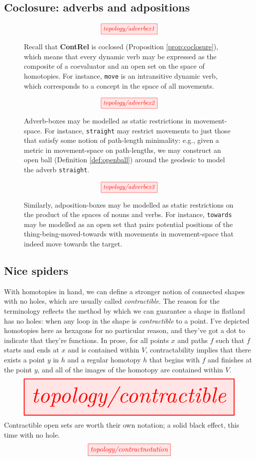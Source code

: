\clearpage

\subsection{Coclosure: adverbs and adpositions}

\begin{figure}[h!]
\[\scalebox{0.9}{\tikzfig{topology/adverbex1}}\]
\caption{
Recall that \textbf{ContRel} is coclosed (Proposition \ref{prop:coclosure}), which means that every dynamic verb may be expressed as the composite of a coevaluator and an open set on the space of homotopies. For instance, \texttt{move} is an intransitive dynamic verb, which corresponds to a concept in the space of all movements.
}
\end{figure}

\begin{figure}[h!]
\[\scalebox{0.9}{\tikzfig{topology/adverbex2}}\]
\caption{
Adverb-boxes may be modelled as static restrictions in movement-space. For instance, \texttt{straight} may restrict movements to just those that satisfy some notion of path-length minimality: e.g., given a metric in movement-space on path-lengths, we may construct an open ball (Definition \ref{def:openball}) around the geodesic to model the adverb \texttt{straight}.
}
\end{figure}

\begin{figure}[h!]
\[\scalebox{0.9}{\tikzfig{topology/adverbex3}}\]
\caption{
Similarly, adposition-boxes may be modelled as static restrictions on the product of the spaces of nouns and verbs. For instance, \texttt{towards} may be modelled as an open set that pairs potential positions of the thing-being-moved-towards with movements in movement-space that indeed move towards the target.
}
\end{figure}

\clearpage

\subsection{Nice spiders}

\begin{example}[Contractibility]\label{defn:contractible}
With homotopies in hand, we can define a stronger notion of connected shapes with no holes, which are usually called \emph{contractible}. The reason for the terminology reflects the method by which we can guarantee a shape in flatland has no holes: when any loop in the shape is \emph{contractible} to a point. I've depicted homotopies here as hexagons for no particular reason, and they've got a dot to indicate that they're functions. In prose, for all points $x$ and paths $f$ such that $f$ starts and ends at $x$ and is contained within $V$, contractability implies that there exists a point $y$ in $h$ and a regular homotopy $h$ that begins with $f$ and finishes at the point $y$, and all of the images of the homotopy are contained within $V$.
\[\resizebox{\textwidth}{!}{\tikzfig{topology/contractible}}\]
Contractible open sets are worth their own notation; a solid black effect, this time with no hole.
\[\tikzfig{topology/contractnotation}\]
\end{example}

